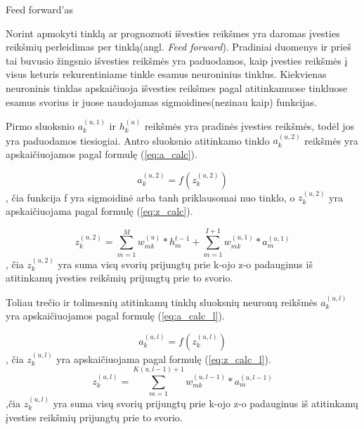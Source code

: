 Feed forward'as

Norint apmokyti tinklą ar prognozuoti išvesties reikšmes yra daromas įvesties reikšmių perleidimas per tinklą(angl. \textit{Feed forward}). Pradiniai duomenys ir prieš tai buvusio žingsnio išvesties reikšmės yra paduodamos, kaip įvesties reikšmės į visus keturis rekurentiniame tinkle esamus neuroninius tinklus. Kiekvienas neuroninis tinklas apskaičiuoja išvesties reikšmes pagal atitinkamuose tinkluose esamus svorius ir juose naudojamas sigmoidines(nezinau kaip) funkcijas.

Pirmo sluoksnio \begin{math}a_k^{(u,1)}\end{math} ir \begin{math}h_k^{(u)}\end{math} reikšmės yra pradinės įvesties reikšmės, todėl jos yra paduodamos tiesiogiai.
Antro sluoksnio atitinkamo tinklo \begin{math}a_k^{(u,2)}\end{math} reikšmės yra apskaičiuojamos pagal formulę (\ref{eq:a_calc}).

\begin{equation}\label{eq:a_calc}
  a_k^{(u,2)} = f(z_k^{(u,2)})
\end{equation}
, čia funkcija f yra sigmoidinė arba tanh priklausomai nuo tinklo, o \begin{math}z_k^{(u,2)}\end{math} yra apskaičiuojama pagal formulę (\ref{eq:z_calc}).

\begin{equation}\label{eq:z_calc}
  z_k^{(u,2)} = \sum_{m=1}^{M} w_{mk}^{(u)}*h_m^{t-1} + \sum_{m=1}^{I+1} w_{mk}^{(u,1)}*a_m^{(u,1)}
\end{equation}
, čia \begin{math}z_k^{(u,2)}\end{math} yra suma visų svorių prijungtų prie k-ojo z-o padauginus iš atitinkamų įvesties reikšmių prijungtų prie to svorio.

Toliau trečio ir tolimesnių atitinkamų tinklų sluoksnių neuronų reikšmės \begin{math}a_k^{(u,l)}\end{math} yra apskaičiuojamos pagal formulę (\ref{eq:a_calc_l}).

\begin{equation}\label{eq:a_calc_l}
  a_k^{(u,l)} = f(z_k^{(u,l)})
\end{equation}
, čia \begin{math}z_k^{(u,l)}\end{math} yra apskaičiuojama pagal formulę (\ref{eq:z_calc_l}).
\begin{equation}\label{eq:z_calc_l}
  z_k^{(u,l)} = \sum_{m=1}^{K(u,l-1)+1} w_{mk}^{(u,l-1)}*a_m^{(u,l-1)}
\end{equation}
,čia \begin{math}z_k^{(u,l)}\end{math} yra suma visų svorių prijungtų prie k-ojo z-o padauginus iš atitinkamų įvesties reikšmių prijungtų prie to svorio.


